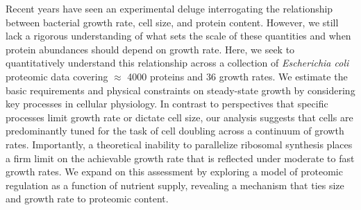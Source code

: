 
Recent years have seen an experimental deluge interrogating the relationship
between bacterial growth rate, cell size, and protein content. However, we still
lack a rigorous understanding of what sets the scale of these quantities and
when protein abundances should depend on growth rate. Here, we
seek to quantitatively understand this relationship across a collection of
\textit{Escherichia coli} proteomic data covering $\approx$ 4000 proteins and 36
growth rates. We estimate the basic requirements and physical constraints on
steady-state growth by considering key processes in cellular physiology. In contrast to
perspectives that specific processes limit growth rate or dictate cell size, our
analysis suggests that cells are predominantly tuned for the task of cell doubling
across a continuum of growth rates. Importantly, a theoretical inability to
parallelize ribosomal synthesis places a firm limit on the achievable growth rate
that is reflected under moderate to fast growth rates. We expand on this
assessment by exploring a model of proteomic regulation as a function of
nutrient supply, revealing a mechanism that ties size and growth rate to proteomic content.
